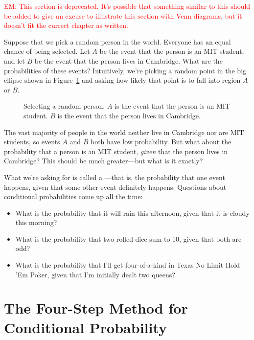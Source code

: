 \begin{editingnotes}

\textcolor{red}{ EM: This section is deprecated.  It's possible that
  something similar to this should be added to give an excuse to
  illustrate this section with Venn diagrams, but it doesn't fit the
  currect chapter as written.}

Suppose that we pick a random person in the world.  Everyone has an
equal chance of being selected.  Let $A$ be the event that the person
is an MIT student, and let $B$ be the event that the person lives in
Cambridge.  What are the probabilities of these events?  Intuitively,
we're picking a random point in the big ellipse shown in
Figure~\ref{fig:15B1} and asking how likely that point is to fall into
region $A$ or $B$.

\begin{figure}[h]


\caption{Selecting a random person.  $A$ is the event that the person
  is an MIT student.  $B$ is the event that the person lives in
  Cambridge.}

\label{fig:15B1}

\end{figure}

The vast majority of people in the world neither live in Cambridge nor
are MIT students, so events $A$ and $B$ both have low probability.
But what about the probability that a person is an MIT student,
\emph{given} that the person lives in Cambridge?  This should be
much greater---but what is it exactly?

What we're asking for is called a ---that is, the probability that one event happens,
given that some other event definitely happens.  Questions about
conditional probabilities come up all the time:
%
\begin{itemize}
\item What is the probability that it will rain this afternoon, given
that it is cloudy this morning?
\item What is the probability that two rolled dice sum to 10, given
that both are odd?
\item What is the probability that I'll get four-of-a-kind in Texas No
Limit Hold 'Em Poker, given that I'm initially dealt two queens?
\end{itemize}
\end{editingnotes}

\section{The Four-Step Method for Conditional Probability}


